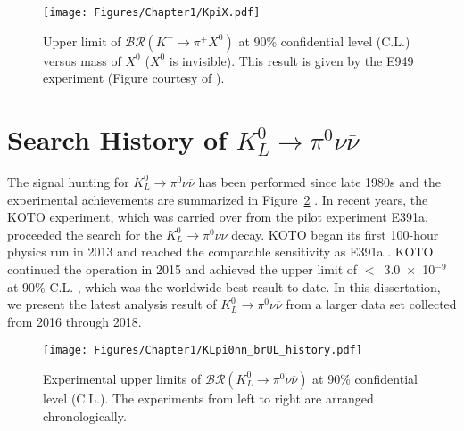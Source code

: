 \begin{figure}[h]
\begin{center}
\captionsetup{width=.99\linewidth}
\texttt{[image: Figures/Chapter1/KpiX.pdf]}
\caption{Upper limit of $\mathcal{BR}(K^+\to\pi^+X^0)$ at 90\% confidential level (C.L.) versus mass of $X^0$ ($X^0$ is invisible). This result is given by the E949 experiment (Figure courtesy of \parencite{KpiX}). }
\label{fig:KpiX}
\end{center}
\end{figure}


\section{Search History of $K_L^0\to\pi^0\nu\overline{\nu}$}

The signal hunting for $K_L^0\to\pi^0\nu\overline{\nu}$ has been performed since late 1980s and the experimental achievements are summarized in Figure~\ref{fig:KLpi0nn_UL_history}  \parencite{KLpi0nn_golden, KLpi0nn_E751, KLpi0nn_E799, KLpi0nn_KTeV, KLpi0nn_KTeV_piDalitz, KLpi0nn_e391a, KLpi0nn_KOTO_2013, KLpi0nn_KOTO_2015}. In recent years, the KOTO experiment, which was carried over from the pilot experiment E391a, proceeded the search for the $K_L^0\to\pi^0\nu\overline{\nu}$ decay. KOTO began its first 100-hour physics run in 2013 and reached the comparable sensitivity as E391a \parencite{KLpi0nn_e391a, KLpi0nn_KOTO_2013}. KOTO continued the operation in 2015 and achieved the upper limit of $<$~3.0~$\times$~10$^{-9}$ at 90\% C.L. \parencite{KLpi0nn_KOTO_2015}, which was the worldwide best result to date. In this dissertation, we present the latest analysis result of $K_L^0\to\pi^0\nu\overline{\nu}$ from a larger data set collected from 2016 through 2018. 

\begin{figure}[h]
\begin{center}
\captionsetup{width=.99\linewidth}
\texttt{[image: Figures/Chapter1/KLpi0nn\_brUL\_history.pdf]}
\caption[Experimental upper limits of $\mathcal{BR}(K_L^0\to\pi^0\nu\overline{\nu})$ at 90\% confidential level (C.L.).]{Experimental upper limits of $\mathcal{BR}(K_L^0\to\pi^0\nu\overline{\nu})$ at 90\% confidential level (C.L.). The experiments from left to right are arranged chronologically.}
\label{fig:KLpi0nn_UL_history}
\end{center}
\end{figure}

